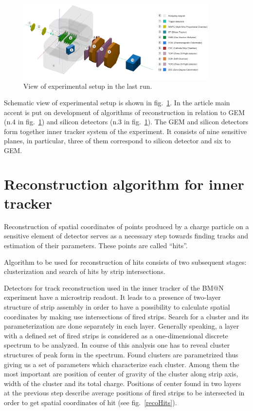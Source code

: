 \documentclass{webofc}
\begin{document}
\begin{figure}[h]
  \centering
  \includegraphics[width=10cm,clip]{fig1.png}
  \caption{View of experimental setup in the last run.}
  \label{bmn}
\end{figure}

Schematic view of experimental setup is shown in fig.~\ref{bmn}. In the article main accent is put on development of algorithms of reconstruction
in relation to GEM (n.4 in fig.~\ref{bmn}) and silicon detectors (n.3 in fig.~\ref{bmn}). The GEM and silicon detectors form together inner tracker system of the experiment.
It consists of nine sensitive planes, in particular, three of them correspond to silicon detector and six to GEM.

\section{Reconstruction algorithm for inner tracker}
\label{hits}

Reconstruction of spatial coordinates of points produced by a charge particle on a sensitive element of detector serves as a necessary step towards finding tracks
and estimation of their parameters. These points are called ``hits''.

Algorithm to be used for reconstruction of hits consists of two subsequent stages: clusterization and search of hits by strip intersections.

Detectors for track reconstruction used in the inner tracker of the BM@N experiment have a microstrip readout. It leads to a presence of two-layer structure of strip assembly
in order to have a possibility to calculate spatial coordinates by making use intersections of fired strips.
Search for a cluster and its parameterization are done separately in each layer.
Generally speaking, a layer with a defined set of fired strips is considered as a one-dimensional discrete spectrum to be analyzed.
In course of this analysis one has to reveal cluster structures of peak form in the spectrum. Found clusters are parametrized thus giving us a set of parameters
which characterize each cluster. Among them the most important are position of center of gravity of the cluster along strip axis, width of the cluster and its total charge.
Positions of center found in two layers at the previous step describe average positions of fired strips to be intersected in order to get spatial coordinates of hit (see fig.~\ref{recoHits}).
\end{document}
